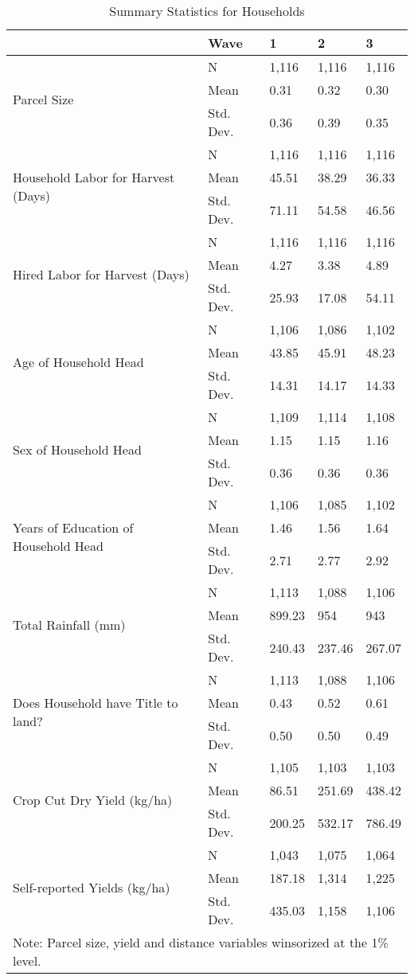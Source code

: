 \begin{table}
\caption{Summary Statistics for Households}
\label{tbl:summary}
\begin{tabular}{lllll}
\toprule
 & Wave & 1 & 2 & 3 \\
\midrule
\multirow[c]{3}{*}{Parcel Size} & N & 1,116 & 1,116 & 1,116 \\
 & Mean & 0.31 & 0.32 & 0.30 \\
 & Std. Dev. & 0.36 & 0.39 & 0.35 \\
\multirow[c]{3}{*}{Household Labor for Harvest (Days)} & N & 1,116 & 1,116 & 1,116 \\
 & Mean & 45.51 & 38.29 & 36.33 \\
 & Std. Dev. & 71.11 & 54.58 & 46.56 \\
\multirow[c]{3}{*}{Hired Labor for Harvest (Days)} & N & 1,116 & 1,116 & 1,116 \\
 & Mean & 4.27 & 3.38 & 4.89 \\
 & Std. Dev. & 25.93 & 17.08 & 54.11 \\
\multirow[c]{3}{*}{Age of Household Head} & N & 1,106 & 1,086 & 1,102 \\
 & Mean & 43.85 & 45.91 & 48.23 \\
 & Std. Dev. & 14.31 & 14.17 & 14.33 \\
\multirow[c]{3}{*}{Sex of Household Head} & N & 1,109 & 1,114 & 1,108 \\
 & Mean & 1.15 & 1.15 & 1.16 \\
 & Std. Dev. & 0.36 & 0.36 & 0.36 \\
\multirow[c]{3}{*}{Years of Education of Household Head} & N & 1,106 & 1,085 & 1,102 \\
 & Mean & 1.46 & 1.56 & 1.64 \\
 & Std. Dev. & 2.71 & 2.77 & 2.92 \\
\multirow[c]{3}{*}{Total Rainfall (mm)} & N & 1,113 & 1,088 & 1,106 \\
 & Mean & 899.23 & 954 & 943 \\
 & Std. Dev. & 240.43 & 237.46 & 267.07 \\
\multirow[c]{3}{*}{Does Household have Title to land?} & N & 1,113 & 1,088 & 1,106 \\
 & Mean & 0.43 & 0.52 & 0.61 \\
 & Std. Dev. & 0.50 & 0.50 & 0.49 \\
\multirow[c]{3}{*}{Crop Cut Dry Yield (kg/ha)} & N & 1,105 & 1,103 & 1,103 \\
 & Mean & 86.51 & 251.69 & 438.42 \\
 & Std. Dev. & 200.25 & 532.17 & 786.49 \\
\multirow[c]{3}{*}{Self-reported Yields (kg/ha)} & N & 1,043 & 1,075 & 1,064 \\
 & Mean & 187.18 & 1,314 & 1,225 \\
 & Std. Dev. & 435.03 & 1,158 & 1,106 \\
\bottomrule
\multicolumn{6}{l}{Note: Parcel size, yield and distance variables winsorized at the 1\% level.}
\end{tabular}
\end{table}
